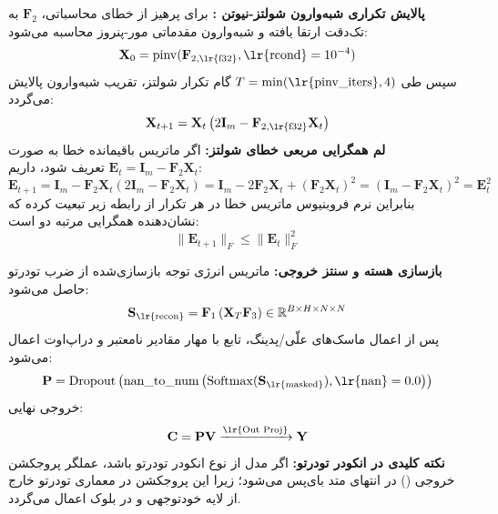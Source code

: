 \textbf{پالایش تکراری شبه‌وارون شولتز-نیوتن :}
برای پرهیز از خطای محاسباتی، $\mathbf{F}_2$ به تک‌دقت  ارتقا یافته و شبه‌وارون مقدماتی مور-پنروز محاسبه می‌شود:
\begin{equation}
\mathbf{X}_0 = \operatorname{pinv}(\mathbf{F}_{2, \text{\lr{f32}}}, \text{\lr{rcond}}=10^{-4})
\end{equation}
سپس طی $T = \min(\text{\lr{pinv\_iters}}, 4)$ گام تکرار شولتز، تقریب شبه‌وارون پالایش می‌گردد:
\begin{equation}
\mathbf{X}_{t+1} = \mathbf{X}_t \left( 2\mathbf{I}_m - \mathbf{F}_{2, \text{\lr{f32}}} \mathbf{X}_t \right)
\end{equation}
\textbf{لم همگرایی مربعی خطای شولتز:} اگر ماتریس باقیمانده خطا به صورت $\mathbf{E}_t = \mathbf{I}_m - \mathbf{F}_2 \mathbf{X}_t$ تعریف شود، داریم:
\begin{equation}
\mathbf{E}_{t+1} = \mathbf{I}_m - \mathbf{F}_2 \mathbf{X}_t (2\mathbf{I}_m - \mathbf{F}_2 \mathbf{X}_t) = \mathbf{I}_m - 2\mathbf{F}_2\mathbf{X}_t + (\mathbf{F}_2\mathbf{X}_t)^2 = (\mathbf{I}_m - \mathbf{F}_2\mathbf{X}_t)^2 = \mathbf{E}_t^2
\end{equation}
بنابراین نرم فروبنیوس ماتریس خطا در هر تکرار از رابطه زیر تبعیت کرده که نشان‌دهنده همگرایی مرتبه دو است:
\begin{equation}
\|\mathbf{E}_{t+1}\|_F \le \|\mathbf{E}_t\|_F^2
\end{equation}

\textbf{بازسازی هسته و سنتز خروجی:}
ماتریس انرژی توجه بازسازی‌شده از ضرب تودرتو حاصل می‌شود:
\begin{equation}
\mathbf{S}_{\text{\lr{recon}}} = \mathbf{F}_1 \left( \mathbf{X}_T \mathbf{F}_3 \right) \in \mathbb{R}^{B \times H \times N \times N}
\end{equation}
پس از اعمال ماسک‌های علّی/پدینگ، تابع  با مهار مقادیر نامعتبر  و دراپ‌اوت اعمال می‌شود:
\begin{equation}
\mathbf{P} = \operatorname{Dropout}\left( \operatorname{nan\_to\_num}\left(\operatorname{Softmax}(\mathbf{S}_{\text{\lr{masked}}}), \text{\lr{nan}}=0.0\right) \right)
\end{equation}
خروجی نهایی:
\begin{equation}
\mathbf{C} = \mathbf{P} \mathbf{V} \xrightarrow{\text{\lr{Out Proj}}} \mathbf{Y}
\end{equation}
\textbf{نکته کلیدی در انکودر تودرتو:} اگر مدل از نوع انکودر تودرتو  باشد، عملگر پروجکشن خروجی () در انتهای متد  بای‌پس می‌شود؛ زیرا این پروجکشن در معماری تودرتو خارج از لایه خودتوجهی و در بلوک  اعمال می‌گردد.


